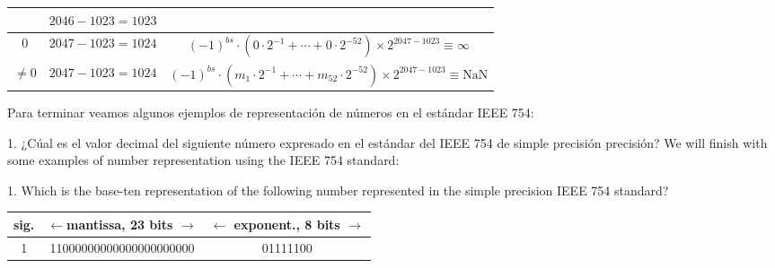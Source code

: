 \begin{table}[h]
\begin{tabular}{ccc}
&$2046-1023=1023$& \\
\hline
$0$&$2047-1023=1024$&$(-1)^{bs}\cdot(0\cdot2^{-1}+\cdots+0\cdot2^{-52})\times2^{2047-1023}\equiv\infty$\\
$\neq 0$&$2047-1023=1024$&$(-1)^{bs}\cdot(m_1\cdot2^{-1}+\cdots+m_{52}\cdot2^{-52})\times2^{2047-1023}\equiv \text{NaN}$\\
\hline
\end{tabular}
\label{tbieee}
\end{table}
\begin{paracol}{2}
Para terminar veamos algunos ejemplos de representación de números en el estándar IEEE 754:

1. ¿Cúal es el valor decimal del siguiente número expresado en el estándar del IEEE 754 de simple precisión precisión?
\switchcolumn
We will finish with some examples of number representation using the IEEE 754 standard:

1. Which is the base-ten representation of the following number represented in the simple precision IEEE 754 standard?
\end{paracol}
\begin{minipage}{\textwidth}
	\centering
\begin{tabular}{|c||c||c|}
\hline
sig.&$\leftarrow$mantissa, 23 bits $\rightarrow$&$\leftarrow$ exponent., 8 bits $\rightarrow$\\
\hline
1&11000000000000000000000&01111100\\
\hline
\end{tabular}\\
\end{minipage}
